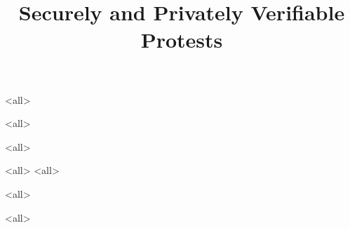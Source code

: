 \title{%
  Securely and Privately Verifiable Protests
}

\maketitle

\mode*

\begin{abstract}
  
\end{abstract}

\clearpage
\tableofcontents
\clearpage

\mode<all>


\mode<all>

\mode<all>


\mode<all>
%
\mode<all>
%

\mode<all>

\mode<all>




\begin{frame}[allowframebreaks]
  \printbibliography{}
\end{frame}
